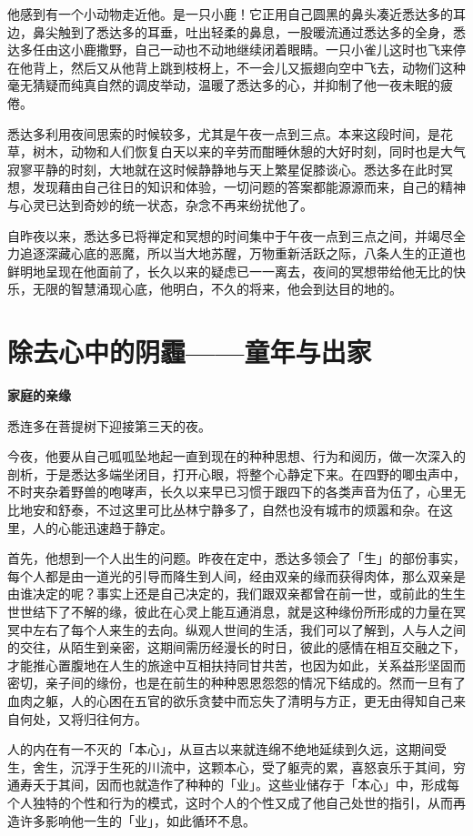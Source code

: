 \documentclass[twoside,openany]{book}
\newcommand{\mt}[1]{\textbullet \textbf{#1}}
\begin{document}
他感到有一个小动物走近他。是一只小鹿！它正用自己圆黑的鼻头凑近悉达多的耳边，鼻尖触到了悉达多的耳垂，吐出轻柔的鼻息，一股暖流通过悉达多的全身，悉达多任由这小鹿撒野，自己一动也不动地继续闭着眼睛。一只小雀儿这时也飞来停在他背上，然后又从他背上跳到枝枒上，不一会儿又振翅向空中飞去，动物们这种毫无猜疑而纯真自然的调皮举动，温暖了悉达多的心，并抑制了他一夜未眠的疲倦。

悉达多利用夜间思索的时候较多，尤其是午夜一点到三点。本来这段时间，是花草，树木，动物和人们恢复白天以来的辛劳而酣睡休憩的大好时刻，同时也是大气寂寥平静的时刻，大地就在这时候静静地与天上繁星促膝谈心。悉达多在此时冥想，发现藉由自己往日的知识和体验，一切问题的答案都能源源而来，自己的精神与心灵已达到奇妙的统一状态，杂念不再来纷扰他了。

自昨夜以来，悉达多已将禅定和冥想的时间集中于午夜一点到三点之间，并竭尽全力追逐深藏心底的恶魔，所以当大地苏醒，万物重新活跃之际，八条人生的正道也鲜明地呈现在他面前了，长久以来的疑虑已一一离去，夜间的冥想带给他无比的快乐，无限的智慧涌现心底，他明白，不久的将来，他会到达目的地的。

\section{除去心中的阴霾——童年与出家}\label{sec1.12}

\mt{家庭的亲缘}

悉连多在菩提树下迎接第三天的夜。

今夜，他要从自己呱呱坠地起一直到现在的种种思想、行为和阅历，做一次深入的剖析，于是悉达多端坐闭目，打开心眼，将整个心静定下来。在四野的唧虫声中，不时夹杂着野兽的咆哮声，长久以来早已习惯于跟四下的各类声音为伍了，心里无比地安和舒泰，不过这里可比丛林宁静多了，自然也没有城市的烦嚣和杂。在这里，人的心能迅速趋于静定。

首先，他想到一个人出生的问题。昨夜在定中，悉达多领会了「生」的部份事实，每个人都是由一道光的引导而降生到人间，经由双亲的缘而获得肉体，那么双亲是由谁决定的呢？事实上还是自己决定的，我们跟双亲都曾在前一世，或前此的生生世世结下了不解的缘，彼此在心灵上能互通消息，就是这种缘份所形成的力量在冥冥中左右了每个人来生的去向。纵观人世间的生活，我们可以了解到，人与人之间的交往，从陌生到亲密，这期间需历经漫长的时日，彼此的感情在相互交融之下，才能推心置腹地在人生的旅途中互相扶持同甘共苦，也因为如此，关系益形坚固而密切，亲子间的缘份，也是在前生的种种恩恩怨怨的情况下结成的。然而一旦有了血肉之躯，人的心困在五官的欲乐贪婪中而忘失了清明与方正，更无由得知自己来自何处，又将归往何方。

人的内在有一不灭的「本心」，从亘古以来就连绵不绝地延续到久远，这期间受生，舍生，沉浮于生死的川流中，这颗本心，受了躯壳的累，喜怒哀乐于其间，穷通寿夭于其间，因而也就造作了种种的「业」。这些业储存于「本心」中，形成每个人独特的个性和行为的模式，这时个人的个性又成了他自己处世的指引，从而再造许多影响他一生的「业」，如此循环不息。
\end{document}
